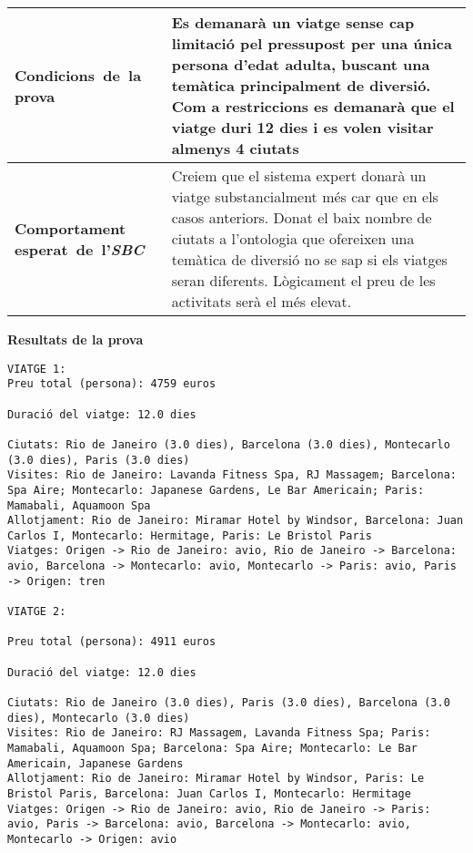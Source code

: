 \documentclass[11pt,a4paper]{article}
\begin{document}
\noindent
\begin{tabular}{|p{}|p{}|}

\hline
\textbf{\mbox{Condicions de la} \mbox{prova}} & Es demanarà un viatge sense cap limitació pel pressupost per una única persona d'edat adulta, buscant una temàtica principalment de diversió. Com a restriccions es demanarà que el viatge duri 12 dies i es volen visitar almenys 4 ciutats\\
\hline
\textbf{Comportament \mbox{esperat de l'\emph{SBC}}} & Creiem que el sistema expert donarà un viatge substancialment més car que en els casos anteriors. Donat el baix nombre de ciutats a l'ontologia que ofereixen una temàtica de diversió no se sap si els viatges seran diferents. Lògicament el preu de les activitats serà el més elevat.\\
\hline
\end{tabular}

\bigskip
\textbf{Resultats de la prova} 
\begin{lstlisting}
VIATGE 1:
Preu total (persona): 4759 euros

Duració del viatge: 12.0 dies

Ciutats: Rio de Janeiro (3.0 dies), Barcelona (3.0 dies), Montecarlo (3.0 dies), Paris (3.0 dies)
Visites: Rio de Janeiro: Lavanda Fitness Spa, RJ Massagem; Barcelona: Spa Aire; Montecarlo: Japanese Gardens, Le Bar Americain; Paris: Mamabali, Aquamoon Spa
Allotjament: Rio de Janeiro: Miramar Hotel by Windsor, Barcelona: Juan Carlos I, Montecarlo: Hermitage, Paris: Le Bristol Paris
Viatges: Origen -> Rio de Janeiro: avio, Rio de Janeiro -> Barcelona: avio, Barcelona -> Montecarlo: avio, Montecarlo -> Paris: avio, Paris -> Origen: tren

VIATGE 2:

Preu total (persona): 4911 euros

Duració del viatge: 12.0 dies

Ciutats: Rio de Janeiro (3.0 dies), Paris (3.0 dies), Barcelona (3.0 dies), Montecarlo (3.0 dies)
Visites: Rio de Janeiro: RJ Massagem, Lavanda Fitness Spa; Paris: Mamabali, Aquamoon Spa; Barcelona: Spa Aire; Montecarlo: Le Bar Americain, Japanese Gardens
Allotjament: Rio de Janeiro: Miramar Hotel by Windsor, Paris: Le Bristol Paris, Barcelona: Juan Carlos I, Montecarlo: Hermitage
Viatges: Origen -> Rio de Janeiro: avio, Rio de Janeiro -> Paris: avio, Paris -> Barcelona: avio, Barcelona -> Montecarlo: avio, Montecarlo -> Origen: avio


\end{lstlisting} 
\end{document}
